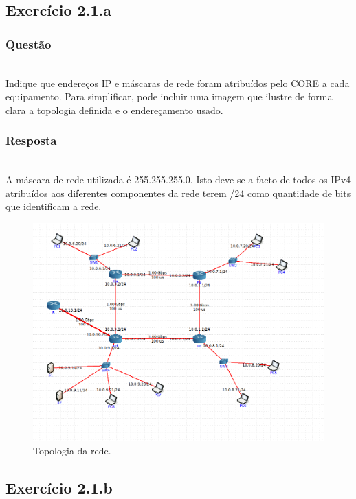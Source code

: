 \documentclass{llncs}
\begin{document}
\subsection{Exercício 2.1.a}
\subsubsection{Questão}\rule[-10pt]{0pt}{10pt}\\

Indique que endereços IP e máscaras de rede foram atribuídos pelo CORE a cada equipamento. Para simplificar, pode incluir uma imagem que ilustre de forma clara a topologia definida e o endereçamento usado.

\subsubsection{Resposta}\rule[-10pt]{0pt}{10pt}\\

A máscara de rede utilizada é 255.255.255.0. Isto deve-se a facto de todos os IPv4 atribuídos aos diferentes componentes da rede terem /24 como quantidade de bits que identificam a rede.

\begin{figure}
	\begin{center}
	\includegraphics[scale=0.35]{./imagens/rede.png} 
	\end{center}
	\caption{\label{fig:rede}Topologia da rede.}
\end{figure} 

\subsection{Exercício 2.1.b}
\end{document}
